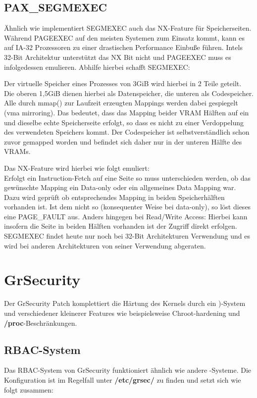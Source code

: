\subsection{PAX\_SEGMEXEC}
\label{subsec:PAX_SEGMEXEC}
Ähnlich wie  implementiert SEGMEXEC auch das NX-Feature für Speicherseiten. Während PAGEEXEC auf den meisten Systemen zum Einsatz kommt, kann es auf IA-32 Prozessoren zu einer drastischen Performance Einbuße führen. Intels 32-Bit Architektur unterstützt das NX Bit nicht und PAGEEXEC muss es infolgedessen emulieren.
Abhilfe hierbei schafft SEGMEXEC:

Der virtuelle Speicher eines Prozesses von 3GiB wird hierbei in 2 Teile geteilt. Die oberen 1,5GiB dienen hierbei als Datenspeicher, die unteren als Codespeicher. Alle durch mmap() zur Laufzeit erzeugten Mappings werden dabei gespiegelt (vma mirroring). Das bedeutet, dass das Mapping beider VRAM Hälften auf ein und dieselbe echte Speicherseite erfolgt, so dass es nicht zu einer Verdoppelung des verwendeten Speichers kommt. Der Codespeicher ist selbstverständlich schon zuvor gemapped worden und befindet sich daher nur in der unteren Hälfte des VRAMs.

Das NX-Feature wird hierbei wie folgt emuliert:\\
Erfolgt ein Instruction-Fetch auf eine Seite so muss unterschieden werden, ob das gewünschte Mapping ein Data-only oder ein allgemeines Data Mapping war. Dazu wird geprüft ob entsprechendes Mapping in beiden Speicherhälften vorhanden ist. Ist dem nicht so (konsequenter Weise bei data-only), so löst dieses eine PAGE\_FAULT aus. Anders hingegen bei Read/Write Access: Hierbei kann insofern die Seite in beiden Hälften vorhanden ist der Zugriff direkt erfolgen.\\
SEGMEXEC findet heute nur noch bei 32-Bit Architekturen Verwendung und es wird bei anderen Architekturen von seiner Verwendung abgeraten.

\newpage
\section{GrSecurity}
\label{sec:GrSecrity}
Der GrSecurity Patch komplettiert die Härtung des Kernels durch ein )-System und verschiedener kleinerer Features wie beispielsweise Chroot-hardening und \textbf{/proc}-Beschränkungen.

\subsection{RBAC-System}
\label{subsec:RBAC-System}
Das RBAC-System von GrSecurity funktioniert ähnlich wie andere -Systeme. Die Konfiguration ist im Regelfall unter \textbf{/etc/grsec/} zu finden und setzt sich wie folgt zusammen:

